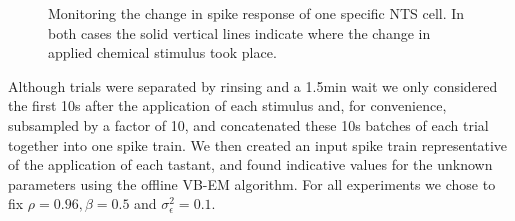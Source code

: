 \documentclass{article}
\begin{document}
\begin{figure}[h] \begin{center}

 \caption{Monitoring the change in spike response of one specific NTS cell. In both
 cases the solid vertical lines indicate where the change in applied chemical stimulus took place.}
 \label{fig:tastants} \end{center} \end{figure}

Although trials were separated by rinsing and a 1.5min wait we only considered the first 10s after the application of each stimulus and, for convenience, subsampled by a factor of 10, and concatenated these 10s batches of each trial together into one spike train. We then created an input spike train representative of the application of each tastant, and found indicative values for the unknown parameters using the offline VB-EM algorithm.  For all experiments we chose to fix $\rho = 0.96, \beta = 0.5$ and $\sigma^2_\epsilon = 0.1$.
\end{document}
